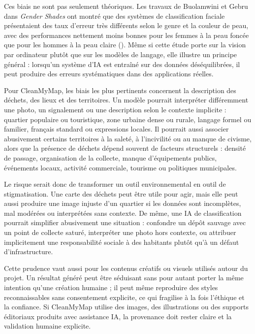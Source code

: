 \documentclass[
  10pt,
  a4paper,
  DIV=11,
  numbers=noendperiod,
  oneside]{scrreprt}
\let\oldemph\emph
\renewcommand{\emph}[1]{\oldemph{\textcolor{cmmgray}{#1}}}
\begin{document}
Ces biais ne sont pas seulement théoriques. Les travaux de Buolamwini et
Gebru dans \emph{Gender Shades} ont montré que des systèmes de
classification faciale présentaient des taux d'erreur très différents
selon le genre et la couleur de peau, avec des performances nettement
moins bonnes pour les femmes à la peau foncée que pour les hommes à la
peau claire (). Même si
cette étude porte sur la vision par ordinateur plutôt que sur les
modèles de langage, elle illustre un principe général : lorsqu'un
système d'IA est entraîné sur des données déséquilibrées, il peut
produire des erreurs systématiques dans des applications réelles.

Pour CleanMyMap, les biais les plus pertinents concernent la description
des déchets, des lieux et des territoires. Un modèle pourrait
interpréter différemment une photo, un signalement ou une description
selon le contexte implicite : quartier populaire ou touristique, zone
urbaine dense ou rurale, langage formel ou familier, français standard
ou expressions locales. Il pourrait aussi associer abusivement certains
territoires à la saleté, à l'incivilité ou au manque de civisme, alors
que la présence de déchets dépend souvent de facteurs structurels :
densité de passage, organisation de la collecte, manque d'équipements
publics, événements locaux, activité commerciale, tourisme ou politiques
municipales.

Le risque serait donc de transformer un outil environnemental en outil
de stigmatisation. Une carte des déchets peut être utile pour agir, mais
elle peut aussi produire une image injuste d'un quartier si les données
sont incomplètes, mal modérées ou interprétées sans contexte. De même,
une IA de classification pourrait simplifier abusivement une situation :
confondre un dépôt sauvage avec un point de collecte saturé, interpréter
une photo hors contexte, ou attribuer implicitement une responsabilité
sociale à des habitants plutôt qu'à un défaut d'infrastructure.

Cette prudence vaut aussi pour les contenus créatifs ou visuels utilisés
autour du projet. Un résultat généré peut être séduisant sans pour
autant porter la même intention qu'une création humaine ; il peut même
reproduire des styles reconnaissables sans consentement explicite, ce
qui fragilise à la fois l'éthique et la confiance. Si CleanMyMap utilise
des images, des illustrations ou des supports éditoriaux produits avec
assistance IA, la provenance doit rester claire et la validation humaine
explicite.
\end{document}
